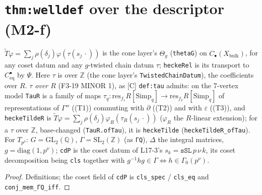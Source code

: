 \section{\texttt{thm:welldef} over the descriptor (M2-f)}

\begin{definition}\label{def:heckeP}
  \leanok
  $\widetilde T\varphi=\sum_j\rho(\delta_j)\varphi(\tau(s_j\,\cdot))$ is the cone layer's $\Theta_g$ (\texttt{thetaG}) on
  $C_\bullet(X_{\mathrm{bulk}})$, for any coset datum and any $g$-twisted chain datum $\tau$; \texttt{heckeRel} is its transport to
  $C^\bullet_{\mathrm{eq}}$ by $\Psi$. Here $\tau$ is over $\mathbb Z$ (the cone layer's \texttt{TwistedChainDatum}), the coefficients
  over $R$. \emph{$\tau$ over $R$} (F3-19 MINOR 1), as [C] \texttt{def:tau} admits: on the 7-vertex model \texttt{TauR} is a family
  of maps $\tau_q:\mathrm{res}_{f_1}R[\mathrm{Simp}_q]\to\mathrm{res}_{f_2}R[\mathrm{Simp}_q]$ of representations of $\Gamma''$
  ((T1)) commuting with $\partial$ ((T2)) and with $\varepsilon$ ((T3)), and \texttt{heckeTildeR} is
  $\widetilde T\varphi=\sum_j\rho(\delta_j)\varphi_R(\tau_R(s_j\,\cdot))$ ($\varphi_R$ the $R$-linear extension); for a $\tau$ over
  $\mathbb Z$, base-changed (\texttt{TauR.ofTau}), it is \texttt{heckeTilde} (\texttt{heckeTildeR\_ofTau}). For $T_{p^\nu}$: $G=\mathrm{GL}_2(\mathbb Q)$, $\Gamma=\mathrm{SL}_2(\mathbb Z)$ (as
  \texttt{ΓQ}), $\Delta$ the integral matrices, $g=\mathrm{diag}(1,p^\nu)$; \texttt{cdP} is the coset datum of L17-3's
  $s_k=\texttt{sSL}\,p\,\nu\,k$, its coset decomposition being \texttt{cls} together with
  $g^{-1}hg\in\Gamma\iff h\in\Gamma_0(p^\nu)$.
\end{definition}
\begin{proof}
  \leanok
  Definitions; the coset field of \texttt{cdP} is \texttt{cls\_spec} / \texttt{cls\_eq} and \texttt{conj\_mem\_ΓQ\_iff}.
\end{proof}


